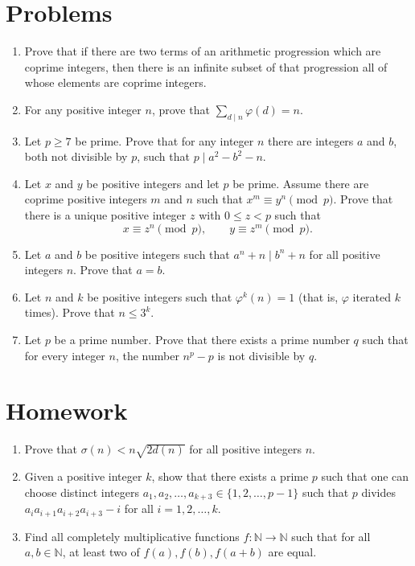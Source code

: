 \documentclass{article}
\begin{document}
\section{Problems}
\begin{enumerate}
	\item Prove that if there are two terms of an arithmetic progression which are
	      coprime integers, then there is an infinite subset of that
	      progression all of whose elements are coprime integers.
	\item For any positive integer $n$, prove that $\displaystyle\sum_{d\mid
			      n}\varphi(d)=n$.
	\item Let $p\ge 7$ be prime. Prove that for any integer $n$ there are integers $a$ and
	      $b$, both not divisible by $p$, such that $p\mid a^2-b^2-n$.
	\item Let $x$ and $y$ be positive integers and let $p$ be prime. Assume there
	      are coprime positive integers $m$ and $n$ such that $x^m\equiv y^n\pmod p$.
	      Prove that there is a unique positive integer $z$ with $0\le z<p$ such that
	      \[x\equiv z^n\pmod p,\qquad y\equiv z^m\pmod p.\]
	\item Let $a$ and $b$ be positive integers such that $a^n+n\mid b^n+n$ for all
	      positive integers $n$. Prove that $a=b$.
	\item Let $n$ and $k$ be positive integers such that $\varphi^k(n)=1$ (that
	      is, $\varphi$ iterated $k$ times). Prove that
	      $n\le 3^k$.
	\item Let $p$ be a prime number. Prove that there exists a prime number $q$
	      such that for every integer $n$, the number $n^p-p$ is not divisible by $q$.
\end{enumerate}
\newpage
\section{Homework}
\begin{enumerate}
	\item Prove that $\sigma(n)<n\sqrt{2d(n)}$ for all positive integers $n$.
	\item Given a positive integer $k$, show that there exists a prime $p$ such
	      that one can choose distinct integers
	      $a_1,a_2,\ldots,a_{k+3}\in\{1,2,\ldots,p-1\}$ such that $p$ divides
	      $a_i a_{i+1}a_{i+2}a_{i+3}-i$ for all $i=1,2,\ldots,k$.
	\item Find all completely multiplicative functions $f:\mathbb N\to\mathbb N$
	      such that for all $a,b\in\mathbb N$, at least two of $f(a),f(b),f(a+b)$ are
	      equal.
\end{enumerate}
\end{document}
